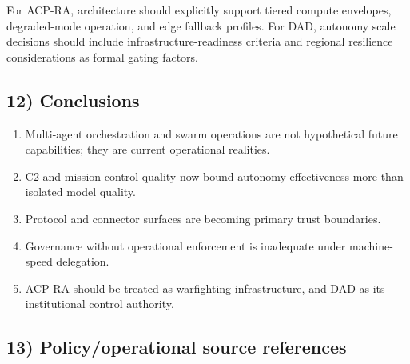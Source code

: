 \documentclass[11pt]{article}
\begin{document}
For ACP-RA, architecture should explicitly support tiered compute
envelopes, degraded-mode operation, and edge fallback profiles. For DAD,
autonomy scale decisions should include infrastructure-readiness
criteria and regional resilience considerations as formal gating
factors.

\hypertarget{conclusions}{%
\subsection{12) Conclusions}\label{conclusions}}

\begin{enumerate}
\def\labelenumi{\arabic{enumi}.}
\tightlist
\item
  Multi-agent orchestration and swarm operations are not hypothetical
  future capabilities; they are current operational realities.
\item
  C2 and mission-control quality now bound autonomy effectiveness more
  than isolated model quality.
\item
  Protocol and connector surfaces are becoming primary trust boundaries.
\item
  Governance without operational enforcement is inadequate under
  machine-speed delegation.
\item
  ACP-RA should be treated as warfighting infrastructure, and DAD as its
  institutional control authority.
\end{enumerate}

\hypertarget{policyoperational-source-references}{%
\subsection{13) Policy/operational source
references}\label{policyoperational-source-references}}
\end{document}
